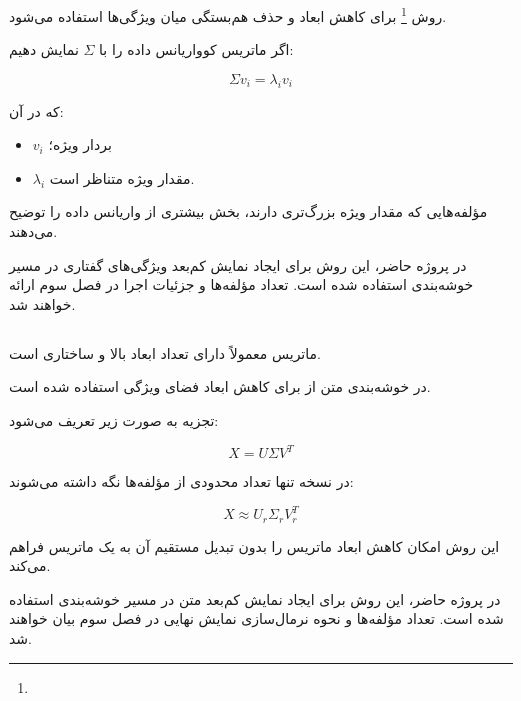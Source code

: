 \documentclass[12pt,a4paper,oneside]{report}
\begin{document}
روش
\footnote{}
برای کاهش ابعاد و حذف هم‌بستگی میان ویژگی‌ها استفاده می‌شود.

اگر ماتریس کوواریانس داده را با $\Sigma$ نمایش دهیم:

\begin{equation}
\Sigma v_i
=
\lambda_i v_i
\end{equation}

که در آن:

\begin{itemize}
	\item $v_i$ بردار ویژه؛
	\item $\lambda_i$ مقدار ویژه متناظر است.
\end{itemize}

مؤلفه‌هایی که مقدار ویژه بزرگ‌تری دارند، بخش بیشتری از واریانس داده را توضیح می‌دهند.

در پروژه حاضر، این روش برای ایجاد نمایش کم‌بعد ویژگی‌های گفتاری در مسیر خوشه‌بندی استفاده شده است. تعداد مؤلفه‌ها و جزئیات اجرا در فصل سوم ارائه خواهند شد.


\subsection{}

ماتریس
معمولاً دارای تعداد ابعاد بالا و ساختاری
است.

در خوشه‌بندی متن از
برای کاهش ابعاد فضای ویژگی استفاده شده است.

تجزیه
به صورت زیر تعریف می‌شود:

\begin{equation}
X
=
U\Sigma V^T
\end{equation}

در نسخه
تنها تعداد محدودی از مؤلفه‌ها نگه داشته می‌شوند:

\begin{equation}
X
\approx
U_r
\Sigma_r
V_r^T
\end{equation}

این روش امکان کاهش ابعاد ماتریس
را بدون تبدیل مستقیم آن به یک ماتریس
فراهم می‌کند.

در پروژه حاضر، این روش برای ایجاد نمایش کم‌بعد متن در مسیر خوشه‌بندی استفاده شده است. تعداد مؤلفه‌ها و نحوه نرمال‌سازی نمایش نهایی در فصل سوم بیان خواهند شد.


\end{document}

